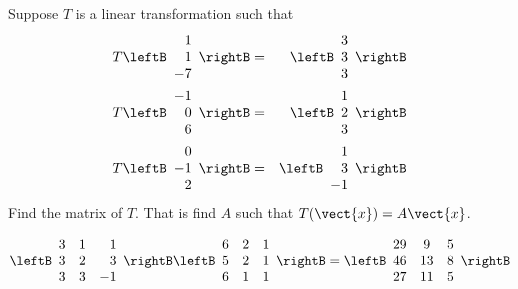 \begin{enumialphparenastyle}
\begin{ex} Suppose $T$ is a linear transformation such that 
\begin{eqnarray*}
T\leftB
\begin{array}{r}
1 \\
1 \\
-7
\end{array}
\rightB &=&\leftB
\begin{array}{r}
3 \\
3 \\
3
\end{array}
\rightB \\
T\leftB
\begin{array}{r}
-1 \\
0 \\
6
\end{array}
\rightB &=&\leftB
\begin{array}{r}
1 \\
2 \\
3
\end{array}
\rightB \\
T\leftB
\begin{array}{r}
0 \\
-1 \\
2
\end{array}
\rightB &=&\leftB
\begin{array}{r}
1 \\
3 \\
-1
\end{array}
\rightB
\end{eqnarray*}
Find the matrix of $T$. That is find $A$ such that $T(\vect{x})=A\vect{x}$. \vspace{1mm}
\begin{sol}
\[
\leftB
\begin{array}{rrr}
3 & 1 & 1 \\
3 & 2 & 3 \\
3 & 3 & -1
\end{array}
\rightB \leftB
\begin{array}{ccc}
6 & 2 & 1 \\
5 & 2 & 1 \\
6 & 1 & 1
\end{array}
\rightB =\allowbreak \leftB
\begin{array}{ccc}
29 & 9 & 5 \\
46 & 13 & 8 \\
27 & 11 & 5
\end{array}
\rightB 
\]
\end{sol}
\end{ex}


\end{enumialphparenastyle}
